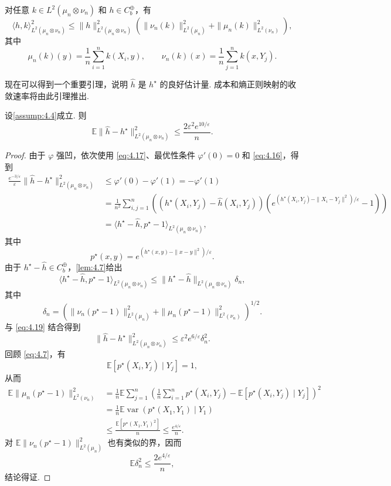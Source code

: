 \begin{lemma}\label{lem:4.7}
对任意 $k\in L^2(\mu_n\otimes\nu_n)$ 和 $h\in C_b^\oplus$，有
$$\langle h,k\rangle_{L^2(\mu_n\otimes\nu_n)}^2
\le\|h\|_{L^2(\mu_n\otimes\nu_n)}^2
\left(\|\nu_n(k)\|_{L^2(\mu_n)}^2+\|\mu_n(k)\|_{L^2(\nu_n)}^2\right),$$
其中
$$\mu_n(k)(y)=\frac1n\sum_{i=1}^n k(X_i,y),\qquad
\nu_n(k)(x)=\frac1n\sum_{j=1}^n k(x,Y_j).$$
\end{lemma}
现在可以得到一个重要引理，说明 $\widehat h$ 是 $h^\star$ 的良好估计量. 成本和熵正则映射的收敛速率将由此引理推出.
\begin{lemma}\label{lem:4.8}
设\autoref{assump:4.4}成立. 则
$$\mathbb E\|\widehat h-h^\star\|_{L^2(\mu_n\otimes\nu_n)}^2\le\frac{2\varepsilon^2e^{10/\varepsilon}}n.$$
\end{lemma}
\begin{proof}
由于 $\varphi$ 强凹，依次使用 \eqref{eq:4.17}、最优性条件 $\varphi'(0)=0$ 和 \eqref{eq:4.16}，得到
\begin{equation}\label{eq:4.19}
\begin{aligned}
\frac{e^{-3/\varepsilon}}\varepsilon\|\widehat h-h^\star\|_{L^2(\mu_n\otimes\nu_n)}^2
&\le\varphi'(0)-\varphi'(1)=-\varphi'(1)\\
&=\frac1{n^2}\sum_{i,j=1}^n
\left((h^\star(X_i,Y_j)-\widehat h(X_i,Y_j))
\left(e^{(h^\star(X_i,Y_j)-\|X_i-Y_j\|^2)/\varepsilon}-1\right)\right)\\
&=\langle h^\star-\widehat h,p^\star-1\rangle_{L^2(\mu_n\otimes\nu_n)},
\end{aligned}
\end{equation}
其中
$$p^\star(x,y)=e^{(h^\star(x,y)-\|x-y\|^2)/\varepsilon}.$$
由于 $h^\star-\widehat h\in C_b^\oplus$，\autoref{lem:4.7}给出
$$\langle h^\star-\widehat h,p^\star-1\rangle_{L^2(\mu_n\otimes\nu_n)}
\le\|h^\star-\widehat h\|_{L^2(\mu_n\otimes\nu_n)}\delta_n,$$
其中
$$\delta_n=\left(\|\nu_n(p^\star-1)\|_{L^2(\mu_n)}^2
+\|\mu_n(p^\star-1)\|_{L^2(\nu_n)}^2\right)^{1/2}.$$
与 \eqref{eq:4.19} 结合得到
\begin{equation}\label{eq:4.20}
\|\widehat h-h^\star\|_{L^2(\mu_n\otimes\nu_n)}^2
\le\varepsilon^2e^{6/\varepsilon}\delta_n^2.
\end{equation}
回顾 \eqref{eq:4.7}，有
$$\mathbb E[p^\star(X_i,Y_j)\mid Y_j]=1,$$
从而
$$\begin{aligned}
\mathbb E\|\mu_n(p^\star-1)\|_{L^2(\nu_n)}^2
&=\frac1n\mathbb E\sum_{j=1}^n
\left(\frac1n\sum_{i=1}^n p^\star(X_i,Y_j)-\mathbb E[p^\star(X_i,Y_j)\mid Y_j]\right)^2\\
&=\frac1n\mathbb E\operatorname{var}(p^\star(X_1,Y_1)\mid Y_1)\\
&\le\frac{\mathbb E[p^\star(X_1,Y_1)^2]}n\le\frac{e^{4/\varepsilon}}n.
\end{aligned}$$
对 $\mathbb E\|\nu_n(p^\star-1)\|_{L^2(\mu_n)}^2$ 也有类似的界，因而
\begin{equation}\label{eq:4.21}
\mathbb E\delta_n^2\le\frac{2e^{4/\varepsilon}}n,
\end{equation}
结论得证.
\end{proof}
